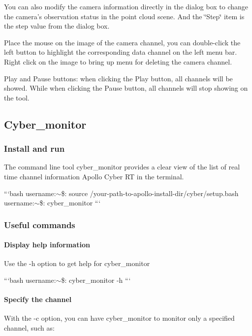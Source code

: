 \begin{DoxyItemize}
You can also modify the camera information directly in the dialog box to change the camera's observation status in the point cloud scene. And the \char`\"{}\-Step\char`\"{} item is the step value from the dialog box.

Place the mouse on the image of the camera channel, you can double-\/click the left button to highlight the corresponding data channel on the left menu bar. Right click on the image to bring up menu for deleting the camera channel.

Play and Pause buttons\-: when clicking the {\ttfamily Play} button, all channels will be showed. While when clicking the {\ttfamily Pause} button, all channels will stop showing on the tool.
\end{DoxyItemize}

\subsection*{Cyber\-\_\-monitor}

\subsubsection*{Install and run}

The command line tool {\ttfamily cyber\-\_\-monitor} provides a clear view of the list of real time channel information Apollo Cyber R\-T in the terminal.

```bash username\-:$\sim$\$\-: source /your-\/path-\/to-\/apollo-\/install-\/dir/cyber/setup.bash username\-:$\sim$\$\-: cyber\-\_\-monitor ```

\subsubsection*{Useful commands}

\paragraph*{Display help information}

Use the -\/h option to get help for cyber\-\_\-monitor

```bash username\-:$\sim$\$\-: cyber\-\_\-monitor -\/h ```

\paragraph*{Specify the channel}

With the -\/c option, you can have cyber\-\_\-monitor to monitor only a specified channel, such as\-:

